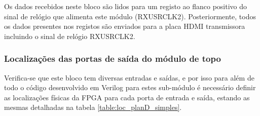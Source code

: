 \documentclass[11pt,a4paper]{article}
\begin{document}
	Os dados recebidos neste bloco são lidos para um registo ao flanco positivo do sinal de relógio que alimenta este módulo (RXUSRCLK2). Posteriormente, todos os dados presentes nos registos são enviados para a placa HDMI transmissora incluindo o sinal de relógio RXUSRCLK2.
	
	\subsubsection*{Localizações das portas de saída do módulo de topo} \label{subsub:serial_locs_planD}
	
	Verifica-se que este bloco tem diversas entradas e saídas, e por isso para além de todo o código desenvolvido em Verilog para estes sub-módulo é necessário definir as localizações físicas da FPGA para cada porta de entrada e saída, estando as mesmas detalhadas na  tabela \ref{table:loc_planD_simples}. 
	
\end{document}
